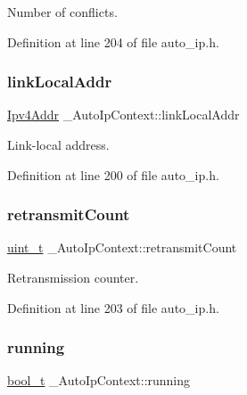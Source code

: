 Number of conflicts. 



Definition at line 204 of file auto\+\_\+ip.\+h.

\mbox{\label{struct__AutoIpContext_a9cb9258b6118f972a659e2742e9caaed}} 
\subsubsection{\texorpdfstring{link\+Local\+Addr}{linkLocalAddr}}
{\footnotesize\ttfamily \hyperlink{ipv4_8h_a411debb3d770caa0c06d3f73367da37f}{Ipv4\+Addr} \+\_\+\+Auto\+Ip\+Context\+::link\+Local\+Addr}



Link-\/local address. 



Definition at line 200 of file auto\+\_\+ip.\+h.

\mbox{\label{struct__AutoIpContext_ab383a1748a1f93187d8a9ac0a7076e92}} 
\subsubsection{\texorpdfstring{retransmit\+Count}{retransmitCount}}
{\footnotesize\ttfamily \hyperlink{compiler__port_8h_a12a1e9b3ce141648783a82445d02b58d}{uint\+\_\+t} \+\_\+\+Auto\+Ip\+Context\+::retransmit\+Count}



Retransmission counter. 



Definition at line 203 of file auto\+\_\+ip.\+h.

\mbox{\label{struct__AutoIpContext_a0f9f1ff73a6b7d650d4ea77ddc151e82}} 
\subsubsection{\texorpdfstring{running}{running}}
{\footnotesize\ttfamily \hyperlink{compiler__port_8h_a812d16e5494522586b3784e55d479912}{bool\+\_\+t} \+\_\+\+Auto\+Ip\+Context\+::running}



